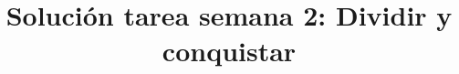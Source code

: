 \documentclass{doc}
\title{Solución tarea semana 2: Dividir y conquistar}
\begin{document}
\makedocheader
\soluciontrue

\end{document}

